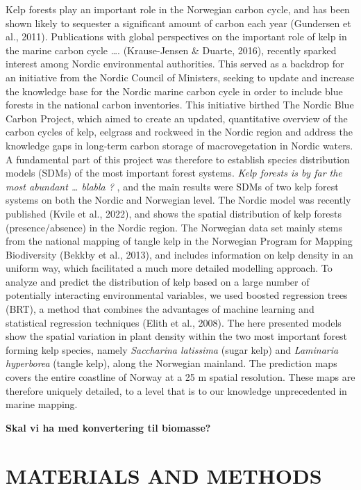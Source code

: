 \documentclass[
]{article}
\begin{document}
Kelp forests play an important role in the Norwegian carbon cycle, and
has been shown likely to sequester a significant amount of carbon each
year (Gundersen et al., 2011). Publications with global perspectives on
the important role of kelp in the marine carbon cycle \ldots.
(Krause-Jensen \& Duarte, 2016), recently sparked interest among Nordic
environmental authorities. This served as a backdrop for an initiative
from the Nordic Council of Ministers, seeking to update and increase the
knowledge base for the Nordic marine carbon cycle in order to include
blue forests in the national carbon inventories. This initiative birthed
The Nordic Blue Carbon Project, which aimed to create an updated,
quantitative overview of the carbon cycles of kelp, eelgrass and
rockweed in the Nordic region and address the knowledge gaps in
long-term carbon storage of macrovegetation in Nordic waters. A
fundamental part of this project was therefore to establish species
distribution models (SDMs) of the most important forest systems.
\emph{Kelp forests is by far the most abundant \ldots{} blabla ? }, and
the main results were SDMs of two kelp forest systems on both the Nordic
and Norwegian level. The Nordic model was recently published (Kvile et
al., 2022), and shows the spatial distribution of kelp forests
(presence/absence) in the Nordic region. The Norwegian data set mainly
stems from the national mapping of tangle kelp in the Norwegian Program
for Mapping Biodiversity (Bekkby et al., 2013), and includes information
on kelp density in an uniform way, which facilitated a much more
detailed modelling approach. To analyze and predict the distribution of
kelp based on a large number of potentially interacting environmental
variables, we used boosted regression trees (BRT), a method that
combines the advantages of machine learning and statistical regression
techniques (Elith et al., 2008). The here presented models show the
spatial variation in plant density within the two most important forest
forming kelp species, namely \emph{Saccharina latissima} (sugar kelp)
and \emph{Laminaria hyperborea} (tangle kelp), along the Norwegian
mainland. The prediction maps covers the entire coastline of Norway at a
25 m spatial resolution. These maps are therefore uniquely detailed, to
a level that is to our knowledge unprecedented in marine mapping.

\textbf{Skal vi ha med konvertering til biomasse?}

\hypertarget{materials-and-methods}{%
\section{MATERIALS AND METHODS}\label{materials-and-methods}}
\end{document}
